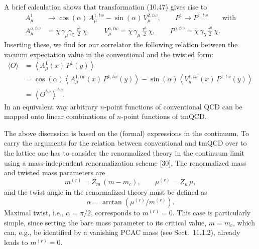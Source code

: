 A brief calculation shows that transformation (10.47) gives rise to
\begin{equation}
  \begin{aligned}
    A^{1}_\mu &\to \cos(\alpha)\,A^{1,tw}_\mu - \sin(\alpha)\,V^{2,tw}_\mu ,
    \qquad P^{1} \to P^{1,tw} \qquad \text{with} \\
    A^{a,tw}_\mu &= \bar\chi\,\gamma_\mu\gamma_5\,\frac{\tau^a}{2}\,\chi ,
    \qquad
    V^{a,tw}_\mu = \bar\chi\,\gamma_\mu\,\frac{\tau^a}{2}\,\chi , \qquad
    P^{a,tw} = \bar\chi\,\gamma_5\,\frac{\tau^a}{2}\,\chi .
  \end{aligned}
\end{equation}
Inserting these, we find for our correlator the following relation between the
vacuum expectation value in the conventional and the twisted form:
\begin{equation}
  \begin{split}
    \langle O\rangle
    &= \left\langle A^1_\mu(x)\,P^1(y)\right\rangle \\
    &= \cos(\alpha)\left\langle A^{1,tw}_\mu(x)\,P^{1,tw}(y)\right\rangle
    - \sin(\alpha)\left\langle V^{1,tw}_\mu(x)\,P^{1,tw}(y)\right\rangle \\
    &= \left\langle O^{tw}\right\rangle^{tw} .
  \end{split}
\end{equation}
In an equivalent way arbitrary $n$-point functions of conventional QCD can be
mapped onto linear combinations of $n$-point functions of tmQCD.

The above discussion is based on the (formal) expressions in the continuum. To
carry the arguments for the relation between conventional and tmQCD over to
the lattice one has to consider the renormalized theory in the continuum limit
using a mass-independent renormalization scheme [30]. The renormalized mass
and twisted mass parameters are
\begin{equation}
  m^{(r)} = Z_m\,(m - m_c) , \qquad \mu^{(r)} = Z_\mu\,\mu ,
\end{equation}
and the twist angle in the renormalized theory must be defined as
\begin{equation}
  \alpha = \arctan\left(\mu^{(r)}/m^{(r)}\right) .
\end{equation}
Maximal twist, i.e., $\alpha = \pi/2$, corresponds to $m^{(r)} = 0$. This case
is particularly simple, since setting the bare mass parameter to its critical
value, $m = m_c$, which can, e.g., be identified by a vanishing PCAC mass (see
Sect.~11.1.2), already leads to $m^{(r)} = 0$.

